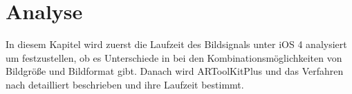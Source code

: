 \chapter{Analyse} %
\label{cha:analyse}
\begin{comment}
	Detaillierte Beschreibung der Algorithmen inkl. O-Notation (Detailierte Darstellung der Algorithmen)
	1. ARToolKitPlus
	2. Zissermann/Clarke
	Analyse: Die Auswertung nach den Kriterien aus Kap. Vorgehen OHNE WERTUNG! Nur die Daten erheben und auswerten.
\end{comment}

In diesem Kapitel wird zuerst die Laufzeit des Bildsignals unter iOS 4 analysiert um festzustellen, ob es Unterschiede
 in bei den Kombinationsmöglichkeiten von Bildgröße und Bildformat gibt. Danach wird ARToolKitPlus und das Verfahren
 nach \citeauthor{hirzer08} detailliert beschrieben und ihre Laufzeit bestimmt.







